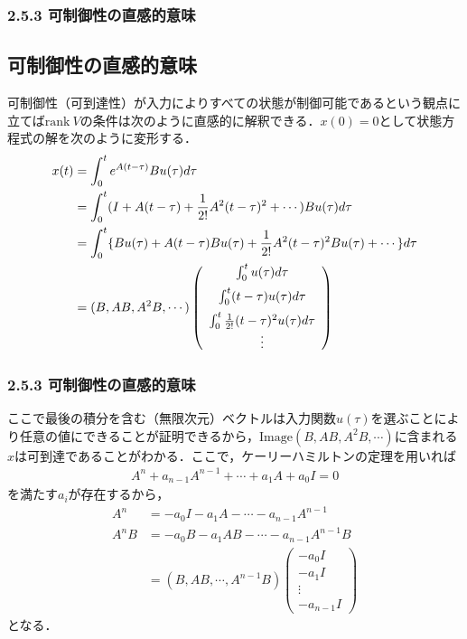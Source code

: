 \begin{frame}[t]
\frametitle{2.5.3 可制御性の直感的意味}

\subsection{可制御性の直感的意味}

可制御性（可到達性）が入力によりすべての状態が制御可能であるという観点に立てば$\mbox{rank}\ V$の条件は次のように直感的に解釈できる．$x(0)=0$として状態方程式の解を次のように変形する．
\begin{align}
 x(t) &= \int_0^t e^{A(t-\tau)} B u(\tau) d \tau
\nonumber \\
 &= \int_0^t (I + A(t-\tau) + {1 \over 2!} A^2 (t-\tau)^2 + \cdots) B u(\tau) d\tau
\nonumber \\
 &= \int_0^t \{ B u(\tau) + A(t-\tau) B u(\tau) 
          + {1 \over 2!} A^2 (t-\tau)^2 B u(\tau) + \cdots \}  d\tau
\nonumber \\
 &= (B, AB, A^2 B, \cdots)
     \left( 
        \begin{array}{c}
            \int_0^t u(\tau) d\tau \\[2mm]
            \int_0^t (t-\tau) u(\tau) d\tau \\[2mm]
            \int_0^t {1 \over 2!} (t-\tau)^2 u(\tau) d\tau \\
            \vdots
        \end{array}
     \right)
\end{align}
\end{frame}

\begin{frame}[t]
\frametitle{2.5.3 可制御性の直感的意味}
ここで最後の積分を含む（無限次元）ベクトルは入力関数$u(\tau)$を選ぶことにより任意の値にできることが証明できるから，$\mbox{Image} (B, AB, A^2B, \cdots)$に含まれる$x$は可到達であることがわかる．ここで，ケーリーハミルトンの定理を用いれば
\begin{align}
	A^n + a_{n-1} A^{n-1} + \cdots + a_1 A + a_0 I = 0
\end{align}
を満たす$a_i$が存在するから，
\begin{align}
	A^n &= - a_0 I  - a_1 A - \cdots - a_{n-1} A^{n-1}
\\
	A^n B &= - a_0 B  - a_1 A B - \cdots - a_{n-1} A^{n-1} B
\nonumber \\
		&= (B, A B, \cdots, A^{n-1} B )
		   \left( \begin{array}{c} 
				- a_{0} I \\
				 - a_{1} I \\
				 \vdots \\
				 - a_{n-1} I \end{array} \right)
\end{align}
となる．
\end{frame}

